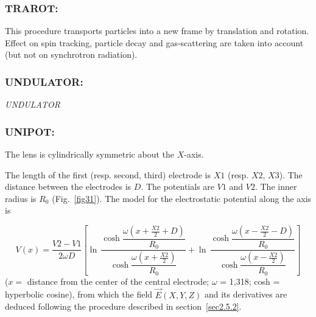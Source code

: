 \newpage

\subsubsection*{TRAROT: \TRAROTTitl} \label{TRAROT} 

This procedure transports particles into a new frame by translation and rotation. Effect on spin tracking, 
particle decay and gas-scattering are taken into account (but not on synchrotron radiation).

\newpage


\subsubsection*{UNDULATOR: \UNDULATORTitl}\label{UNDULATOR}  

\textsl{UNDULATOR} 


\bigskip


\vfill
\begin{figure}[H]
  \vspace{5cm}
  {\setlength{\captionwidth}{12cm}
	 }
\end{figure}
\vfill

\newpage

\subsubsection*{UNIPOT: \UNIPOTTitl} \label{UNIPOT} 

The lens is cylindrically symmetric about the $ X$-axis.  
\bigskip

\noindent The length of the first (resp. second, third) electrode is $ X1 $
(resp. $ X2$, $X3$). The distance between the electrodes is $ D$.  
The potentials are $ V1 $ and $V2$.  The inner radius is $ R_0 $ (Fig.~\ref{fig31}).  
The model for the electrostatic potential along the axis is~\cite{Biblio19}  %

$$ V(x) = 
    \dfrac{V2-V1 }{ 2\omega D} \left[
    \ln\, \dfrac{\cosh 
    	\dfrac{\omega \left(x+ \frac{X2}{ 2}+D \right) }{ R_0} }{
       \cosh \dfrac{\omega \left(x+\frac{X2 }{ 2}\right) }{ R_0}}  
    + \ln\,  \dfrac{\cosh \dfrac{\omega \left(x-\frac{X2 }{ 2}-D\right) }{R_0} }{
       \cosh \dfrac{\omega \left(x-\frac{X2 }{ 2}\right) }{R_0} }
     \right] $$
%
($ x  = $ distance from the center of the central electrode;
$\omega$  = 1,318; cosh = hyperbolic cosine), from which the field $ \vec  E(X,Y,Z) $ and its
derivatives are deduced following the procedure described in section~\ref{sec2.5.2}. 

